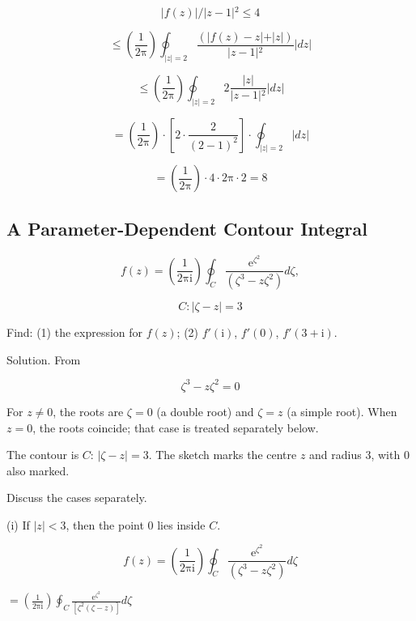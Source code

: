 \documentclass[11pt,a4paper]{article}
\theoremstyle{definition}
\theoremstyle{plain}
\begin{document}
\[
\vert{}f(z)\vert{}/\vert{}z - 1\vert{}^{2} \le 4
\]

\[
\le\left(\frac{1}{2\mathrm{\pi}}\right)\oint_{\vert{}z\vert{} = 2}\frac{(\vert{}f(z) - z\vert{} + \vert{}z\vert{})}{\vert{}z - 1\vert{}^{2}}\vert{}dz\vert{}
\]

\[
\le\left(\frac{1}{2\mathrm{\pi}}\right)\oint_{\vert{}z\vert{} = 2}2\frac{\vert{}z\vert{}}{\vert{}z - 1\vert{}^{2}}\vert{}dz\vert{}
\]

\[
= \left(\frac{1}{2\mathrm{\pi}}\right) \cdot[2 \cdot \frac{2}{(2 - 1)^{2}}] \cdot \oint_{\vert{}z\vert{} = 2}\vert{}dz\vert{}
\]

\[
= \left(\frac{1}{2\mathrm{\pi}}\right) \cdot 4 \cdot 2\mathrm{\pi} \cdot 2 = 8
\]

\subsection{A Parameter-Dependent Contour Integral}

\begin{equation}
f(z) = \left(\frac{1}{2\mathrm{\pi}\mathrm{i}}\right)\oint_{C}\frac{\mathrm{e}^{\zeta^{2}}}{(\zeta^{3} - z\zeta^{2})}d\zeta,
\end{equation}

\[
C:\vert{}\zeta - z\vert{} = 3
\]

Find: (1) the expression for $f(z)$; (2) $f'(\mathrm{i})$, $f'(0)$, $f'(3 + \mathrm{i})$.

Solution. From

\begin{equation}
\zeta^{3} - z\zeta^{2} = 0
\end{equation}

For $z \ne 0$, the roots are $\zeta = 0$ (a double root) and $\zeta = z$ (a simple root). When $z = 0$, the roots coincide; that case is treated separately below.

The contour is $C$: $\vert{}\zeta - z\vert{} = 3$. The sketch marks the centre $z$ and radius 3, with 0 also marked.

Discuss the cases separately.

(i) If $\vert{}z\vert{} < 3$, then the point 0 lies inside $C$.

\begin{equation}
f(z) = \left(\frac{1}{2\mathrm{\pi}\mathrm{i}}\right)\oint_{C}\frac{\mathrm{e}^{\zeta^{2}}}{(\zeta^{3} - z\zeta^{2})}d\zeta
\end{equation}

$= \left(\frac{1}{2\mathrm{\pi}\mathrm{i}}\right)\oint_{C}\frac{\mathrm{e}^{\zeta^{2}}}{[\zeta^{2}(\zeta - z)]}d\zeta$
\end{document}
